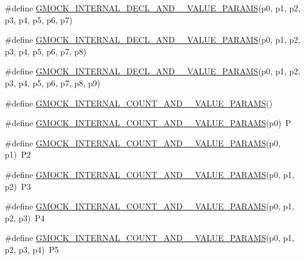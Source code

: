\begin{DoxyCompactItemize}
\item 
\#define \mbox{\hyperlink{gmock-generated-actions_8h_a3ce778c4907edf2818c948a78a94760a}{G\+M\+O\+C\+K\+\_\+\+I\+N\+T\+E\+R\+N\+A\+L\+\_\+\+D\+E\+C\+L\+\_\+\+A\+N\+D\+\_\+\_\+\+V\+A\+L\+U\+E\+\_\+\+P\+A\+R\+A\+MS}}(p0,  p1,  p2,  p3,  p4,  p5,  p6,  p7)
\item 
\#define \mbox{\hyperlink{gmock-generated-actions_8h_a94ebf056f6c78d158bf16eec04583dd0}{G\+M\+O\+C\+K\+\_\+\+I\+N\+T\+E\+R\+N\+A\+L\+\_\+\+D\+E\+C\+L\+\_\+\+A\+N\+D\+\_\+\_\+\+V\+A\+L\+U\+E\+\_\+\+P\+A\+R\+A\+MS}}(p0,  p1,  p2,  p3,  p4,  p5,  p6,  p7,  p8)
\item 
\#define \mbox{\hyperlink{gmock-generated-actions_8h_a125c9b0d293f0e900ff37ce42b8ed217}{G\+M\+O\+C\+K\+\_\+\+I\+N\+T\+E\+R\+N\+A\+L\+\_\+\+D\+E\+C\+L\+\_\+\+A\+N\+D\+\_\+\_\+\+V\+A\+L\+U\+E\+\_\+\+P\+A\+R\+A\+MS}}(p0,  p1,  p2,  p3,  p4,  p5,  p6,  p7,  p8,  p9)
\item 
\#define \mbox{\hyperlink{gmock-generated-actions_8h_a4876365f0389f3cd8021f650d095be55}{G\+M\+O\+C\+K\+\_\+\+I\+N\+T\+E\+R\+N\+A\+L\+\_\+\+C\+O\+U\+N\+T\+\_\+\+A\+N\+D\+\_\+\_\+\+V\+A\+L\+U\+E\+\_\+\+P\+A\+R\+A\+MS}}()
\item 
\#define \mbox{\hyperlink{gmock-generated-actions_8h_a372a4dbbfeba17c2af89aa1027cb7f67}{G\+M\+O\+C\+K\+\_\+\+I\+N\+T\+E\+R\+N\+A\+L\+\_\+\+C\+O\+U\+N\+T\+\_\+\+A\+N\+D\+\_\+\_\+\+V\+A\+L\+U\+E\+\_\+\+P\+A\+R\+A\+MS}}(p0)~P
\item 
\#define \mbox{\hyperlink{gmock-generated-actions_8h_a58ef57d40fec061e17fdcbf020b77e20}{G\+M\+O\+C\+K\+\_\+\+I\+N\+T\+E\+R\+N\+A\+L\+\_\+\+C\+O\+U\+N\+T\+\_\+\+A\+N\+D\+\_\+\_\+\+V\+A\+L\+U\+E\+\_\+\+P\+A\+R\+A\+MS}}(p0,  p1)~P2
\item 
\#define \mbox{\hyperlink{gmock-generated-actions_8h_a43c845e4e60b3e17c4e312bbc5a8bb66}{G\+M\+O\+C\+K\+\_\+\+I\+N\+T\+E\+R\+N\+A\+L\+\_\+\+C\+O\+U\+N\+T\+\_\+\+A\+N\+D\+\_\+\_\+\+V\+A\+L\+U\+E\+\_\+\+P\+A\+R\+A\+MS}}(p0,  p1,  p2)~P3
\item 
\#define \mbox{\hyperlink{gmock-generated-actions_8h_aeb588496af9fc2b8e3c4702dac7e966e}{G\+M\+O\+C\+K\+\_\+\+I\+N\+T\+E\+R\+N\+A\+L\+\_\+\+C\+O\+U\+N\+T\+\_\+\+A\+N\+D\+\_\+\_\+\+V\+A\+L\+U\+E\+\_\+\+P\+A\+R\+A\+MS}}(p0,  p1,  p2,  p3)~P4
\item 
\#define \mbox{\hyperlink{gmock-generated-actions_8h_a29d90b8cedec75d4acbf2df27ef0e3b5}{G\+M\+O\+C\+K\+\_\+\+I\+N\+T\+E\+R\+N\+A\+L\+\_\+\+C\+O\+U\+N\+T\+\_\+\+A\+N\+D\+\_\+\_\+\+V\+A\+L\+U\+E\+\_\+\+P\+A\+R\+A\+MS}}(p0,  p1,  p2,  p3,  p4)~P5

\end{DoxyCompactItemize}
